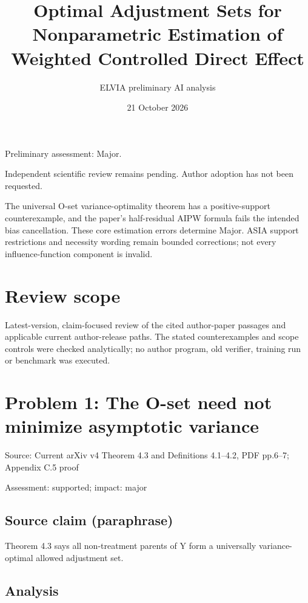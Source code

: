 \documentclass[11pt]{article}
\begin{document}
\title{Optimal Adjustment Sets for Nonparametric Estimation of Weighted Controlled Direct Effect}

\author{ELVIA preliminary AI analysis}\date{21 October 2026}\maketitle

Preliminary assessment: Major.\par

Independent scientific review remains pending. Author adoption has not been requested.

The universal O-set variance-optimality theorem has a positive-support counterexample, and the paper's half-residual AIPW formula fails the intended bias cancellation. These core estimation errors determine Major. ASIA support restrictions and necessity wording remain bounded corrections; not every influence-function component is invalid.

\section*{Review scope}

Latest-version, claim-focused review of the cited author-paper passages and applicable current author-release paths. The stated counterexamples and scope controls were checked analytically; no author program, old verifier, training run or benchmark was executed.

\section*{Problem 1: The O-set need not minimize asymptotic variance}

Source: Current arXiv v4 Theorem 4.3 and Definitions 4.1–4.2, PDF pp.6–7; Appendix C.5 proof

Assessment: supported; impact: major

\subsection*{Source claim (paraphrase)}

Theorem 4.3 says all non-treatment parents of Y form a universally variance-optimal allowed adjustment set.

\subsection*{Analysis}
\end{document}
